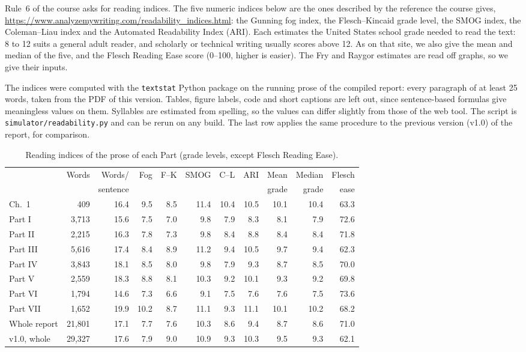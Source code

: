 Rule~6 of the course asks for reading indices. The five numeric indices below are
the ones described by the reference the course gives,
\url{https://www.analyzemywriting.com/readability_indices.html}: the Gunning fog
index, the Flesch--Kincaid grade level, the SMOG index, the Coleman--Liau index and
the Automated Readability Index (ARI). Each estimates the United States school grade
needed to read the text: 8 to 12 suits a general adult reader, and scholarly or
technical writing usually scores above 12. As on that site, we also give the mean
and median of the five, and the Flesch Reading Ease score (0--100, higher is
easier). The Fry and Raygor estimates are read off graphs, so we give their inputs.

The indices were computed with the \texttt{textstat} Python package on the running
prose of the compiled report: every paragraph of at least 25 words, taken from the
PDF of this version. Tables, figure labels, code and short captions are left out,
since sentence-based formulas give meaningless values on them. Syllables are
estimated from spelling, so the values can differ slightly from those of the web
tool. The script is \texttt{simulator/readability.py} and can be rerun on any build.
The last row applies the same procedure to the previous version (v1.0) of the
report, for comparison.

\begin{table}[htbp]
\centering
\caption{Reading indices of the prose of each Part (grade levels, except Flesch
Reading Ease).}
\label{tab:readability}
\small
\setlength{\tabcolsep}{4pt}
\begin{tabular}{@{}l r r r r r r r r r r@{}}
\toprule
 & Words & Words/ & Fog & F--K & SMOG & C--L & ARI & Mean & Median & Flesch \\
 & & sentence & & & & & & grade & grade & ease \\
\midrule
Ch.~1 & 409 & 16.4 & 9.5 & 8.5 & 11.4 & 10.4 & 10.5 & 10.1 & 10.4 & 63.3 \\
Part I & 3,713 & 15.6 & 7.5 & 7.0 & 9.8 & 7.9 & 8.3 & 8.1 & 7.9 & 72.6 \\
Part II & 2,215 & 16.3 & 7.8 & 7.3 & 9.8 & 8.4 & 8.8 & 8.4 & 8.4 & 71.8 \\
Part III & 5,616 & 17.4 & 8.4 & 8.9 & 11.2 & 9.4 & 10.5 & 9.7 & 9.4 & 62.3 \\
Part IV & 3,843 & 18.1 & 8.5 & 8.0 & 9.8 & 7.9 & 9.3 & 8.7 & 8.5 & 70.0 \\
Part V & 2,559 & 18.3 & 8.8 & 8.1 & 10.3 & 9.2 & 10.1 & 9.3 & 9.2 & 69.8 \\
Part VI & 1,794 & 14.6 & 7.3 & 6.6 & 9.1 & 7.5 & 7.6 & 7.6 & 7.5 & 73.6 \\
Part VII & 1,652 & 19.9 & 10.2 & 8.7 & 11.1 & 9.3 & 11.1 & 10.1 & 10.2 & 68.2 \\
\midrule
Whole report & 21,801 & 17.1 & 7.7 & 7.6 & 10.3 & 8.6 & 9.4 & 8.7 & 8.6 & 71.0 \\
\midrule
v1.0, whole & 29,327 & 17.6 & 7.9 & 9.0 & 10.9 & 9.3 & 10.3 & 9.5 & 9.3 & 62.1 \\
\bottomrule
\end{tabular}
\end{table}

